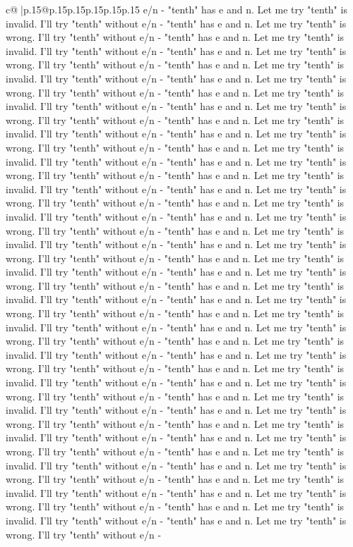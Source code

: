 \documentclass{article}
\begin{document}
{\begin{supertabular}{c@{$\;$}|p{.15\linewidth}@{}p{.15\linewidth}p{.15\linewidth}p{.15\linewidth}p{.15\linewidth}p{.15\linewidth}}
{{{e/n {-} "tenth" has e and n. Let me try "tenth" is invalid. I'll try "tenth" without e/n {-} "tenth" has e and n. Let me try "tenth" is wrong. I'll try "tenth" without e/n {-} "tenth" has e and n. Let me try "tenth" is invalid. I'll try "tenth" without e/n {-} "tenth" has e and n. Let me try "tenth" is wrong. I'll try "tenth" without e/n {-} "tenth" has e and n. Let me try "tenth" is invalid. I'll try "tenth" without e/n {-} "tenth" has e and n. Let me try "tenth" is wrong. I'll try "tenth" without e/n {-} "tenth" has e and n. Let me try "tenth" is invalid. I'll try "tenth" without e/n {-} "tenth" has e and n. Let me try "tenth" is wrong. I'll try "tenth" without e/n {-} "tenth" has e and n. Let me try "tenth" is invalid. I'll try "tenth" without e/n {-} "tenth" has e and n. Let me try "tenth" is wrong. I'll try "tenth" without e/n {-} "tenth" has e and n. Let me try "tenth" is invalid. I'll try "tenth" without e/n {-} "tenth" has e and n. Let me try "tenth" is wrong. I'll try "tenth" without e/n {-} "tenth" has e and n. Let me try "tenth" is invalid. I'll try "tenth" without e/n {-} "tenth" has e and n. Let me try "tenth" is wrong. I'll try "tenth" without e/n {-} "tenth" has e and n. Let me try "tenth" is invalid. I'll try "tenth" without e/n {-} "tenth" has e and n. Let me try "tenth" is wrong. I'll try "tenth" without e/n {-} "tenth" has e and n. Let me try "tenth" is invalid. I'll try "tenth" without e/n {-} "tenth" has e and n. Let me try "tenth" is wrong. I'll try "tenth" without e/n {-} "tenth" has e and n. Let me try "tenth" is invalid. I'll try "tenth" without e/n {-} "tenth" has e and n. Let me try "tenth" is wrong. I'll try "tenth" without e/n {-} "tenth" has e and n. Let me try "tenth" is invalid. I'll try "tenth" without e/n {-} "tenth" has e and n. Let me try "tenth" is wrong. I'll try "tenth" without e/n {-} "tenth" has e and n. Let me try "tenth" is invalid. I'll try "tenth" without e/n {-} "tenth" has e and n. Let me try "tenth" is wrong. I'll try "tenth" without e/n {-} "tenth" has e and n. Let me try "tenth" is invalid. I'll try "tenth" without e/n {-} "tenth" has e and n. Let me try "tenth" is wrong. I'll try "tenth" without e/n {-} "tenth" has e and n. Let me try "tenth" is invalid. I'll try "tenth" without e/n {-} "tenth" has e and n. Let me try "tenth" is wrong. I'll try "tenth" without e/n {-} "tenth" has e and n. Let me try "tenth" is invalid. I'll try "tenth" without e/n {-} "tenth" has e and n. Let me try "tenth" is wrong. I'll try "tenth" without e/n {-} "tenth" has e and n. Let me try "tenth" is invalid. I'll try "tenth" without e/n {-} "tenth" has e and n. Let me try "tenth" is wrong. I'll try "tenth" without e/n {-} "tenth" has e and n. Let me try "tenth" is invalid. I'll try "tenth" without e/n {-} "tenth" has e and n. Let me try "tenth" is wrong. I'll try "tenth" without e/n {-} "tenth" has e and n. Let me try "tenth" is invalid. I'll try "tenth" without e/n {-} "tenth" has e and n. Let me try "tenth" is wrong. I'll try "tenth" without e/n {-} "tenth" has e and n. Let me try "tenth" is invalid. I'll try "tenth" without e/n {-} "tenth" has e and n. Let me try "tenth" is wrong. I'll try "tenth" without e/n {-} }}}
\end{supertabular}}
\end{document}
